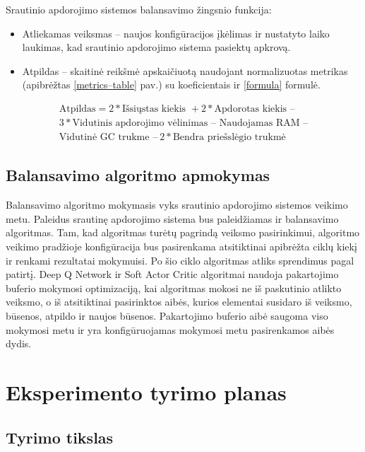 \documentclass{VUMIFPSbakalaurinis}
\begin{document}
Srautinio apdorojimo sistemos balansavimo žingsnio funkcija:
\begin{itemize}
 \item Atliekamas veiksmas – naujos konfigūracijos įkėlimas ir nustatyto laiko laukimas, kad srautinio apdorojimo sistema pasiektų apkrovą.
 \item Atpildas – skaitinė reikšmė apskaičiuotą naudojant normalizuotas metrikas (apibrėžtas \ref{metrics–table} pav.) su koeficientais ir \ref{formula} formulė.
\end{itemize}
\begin{equation}
    \label{formula}
    \begin{gathered}
    \text{Atpildas} = 2*\text{Išsiųstas kiekis } + 2*\text{Apdorotas kiekis }  – \\ 
        3*\text{Vidutinis apdorojimo vėlinimas } – \text{ Naudojamas RAM }  – \\
          \text{Vidutinė GC trukme } – \:2*\text{Bendra priešslėgio trukmė} 
    \end{gathered}
\end{equation}
\subsection{Balansavimo algoritmo apmokymas}

Balansavimo algoritmo mokymasis vyks srautinio apdorojimo sistemos veikimo metu. Paleidus srautinę apdorojimo sistema bus paleidžiamas ir balansavimo algoritmas. Tam, kad algoritmas turėtų pagrindą veiksmo pasirinkimui, algoritmo veikimo pradžioje konfigūracija bus pasirenkama atsitiktinai apibrėžta ciklų kiekį ir renkami rezultatai mokymuisi. Po šio ciklo algoritmas atliks sprendimus pagal patirtį. Deep Q Network ir Soft Actor Critic algoritmai naudoja pakartojimo buferio mokymosi optimizaciją, kai algoritmas mokosi ne iš paskutinio atlikto veiksmo, o iš atsitiktinai pasirinktos aibės, kurios elementai susidaro iš veiksmo, būsenos, atpildo ir naujos būsenos. Pakartojimo buferio aibė saugoma viso mokymosi metu ir yra konfigūruojamas mokymosi metu pasirenkamos aibės dydis. 

\section{Eksperimento tyrimo planas}

\subsection{Tyrimo tikslas}
\end{document}
